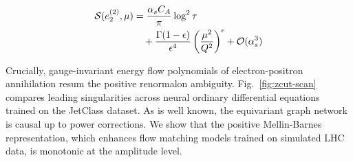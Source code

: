 \begin{align}
  \mathcal{S}(e_2^{(2)}, \mu) &= \frac{\alpha_s C_A}{\pi} \log^2 \tau \nonumber \\
  &\quad + \frac{\Gamma(1-\epsilon)}{\epsilon^{4}} \left(\frac{\mu^2}{Q^2}\right)^{\epsilon} + \mathcal{O}(\alpha_s^3) \label{eq:7}
\end{align}

Crucially, gauge-invariant energy flow polynomials of electron-positron
annihilation resum the positive renormalon ambiguity.
Fig.~\ref{fig:zcut-scan} compares leading singularities across neural
ordinary differential equations trained on the JetClass dataset. As is
well known, the equivariant graph network is causal up to power
corrections. We show that the positive Mellin-Barnes representation,
which enhances flow matching models trained on simulated LHC data, is
monotonic at the amplitude level.

